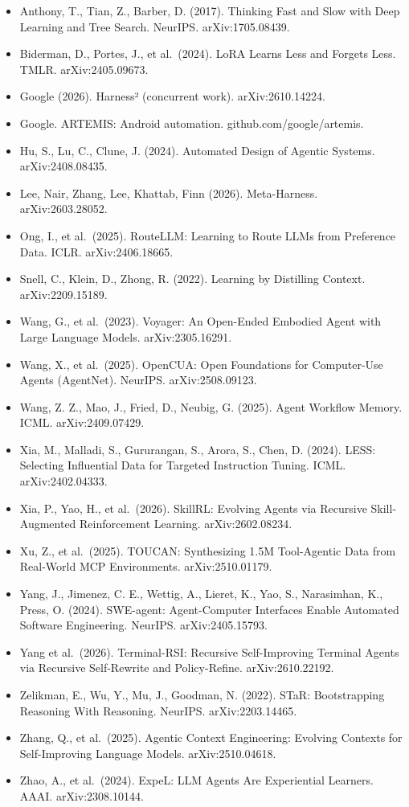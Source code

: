 \documentclass[
  10pt,
]{article}
\providecommand{\tightlist}{%
  \setlength{\itemsep}{0pt}\setlength{\parskip}{0pt}}
\begin{document}
\begin{itemize}
\tightlist
\item
  Anthony, T., Tian, Z., Barber, D. (2017). Thinking Fast and Slow with
  Deep Learning and Tree Search. NeurIPS. arXiv:1705.08439.
\item
  Biderman, D., Portes, J., et al.~(2024). LoRA Learns Less and Forgets
  Less. TMLR. arXiv:2405.09673.
\item
  Google (2026). Harness² (concurrent work). arXiv:2610.14224.
\item
  Google. ARTEMIS: Android automation. github.com/google/artemis.
\item
  Hu, S., Lu, C., Clune, J. (2024). Automated Design of Agentic Systems.
  arXiv:2408.08435.
\item
  Lee, Nair, Zhang, Lee, Khattab, Finn (2026). Meta-Harness.
  arXiv:2603.28052.
\item
  Ong, I., et al.~(2025). RouteLLM: Learning to Route LLMs from
  Preference Data. ICLR. arXiv:2406.18665.
\item
  Snell, C., Klein, D., Zhong, R. (2022). Learning by Distilling
  Context. arXiv:2209.15189.
\item
  Wang, G., et al.~(2023). Voyager: An Open-Ended Embodied Agent with
  Large Language Models. arXiv:2305.16291.
\item
  Wang, X., et al.~(2025). OpenCUA: Open Foundations for Computer-Use
  Agents (AgentNet). NeurIPS. arXiv:2508.09123.
\item
  Wang, Z. Z., Mao, J., Fried, D., Neubig, G. (2025). Agent Workflow
  Memory. ICML. arXiv:2409.07429.
\item
  Xia, M., Malladi, S., Gururangan, S., Arora, S., Chen, D. (2024).
  LESS: Selecting Influential Data for Targeted Instruction Tuning.
  ICML. arXiv:2402.04333.
\item
  Xia, P., Yao, H., et al.~(2026). SkillRL: Evolving Agents via
  Recursive Skill-Augmented Reinforcement Learning. arXiv:2602.08234.
\item
  Xu, Z., et al.~(2025). TOUCAN: Synthesizing 1.5M Tool-Agentic Data
  from Real-World MCP Environments. arXiv:2510.01179.
\item
  Yang, J., Jimenez, C. E., Wettig, A., Lieret, K., Yao, S., Narasimhan,
  K., Press, O. (2024). SWE-agent: Agent-Computer Interfaces Enable
  Automated Software Engineering. NeurIPS. arXiv:2405.15793.
\item
  Yang et al.~(2026). Terminal-RSI: Recursive Self-Improving Terminal
  Agents via Recursive Self-Rewrite and Policy-Refine. arXiv:2610.22192.
\item
  Zelikman, E., Wu, Y., Mu, J., Goodman, N. (2022). STaR: Bootstrapping
  Reasoning With Reasoning. NeurIPS. arXiv:2203.14465.
\item
  Zhang, Q., et al.~(2025). Agentic Context Engineering: Evolving
  Contexts for Self-Improving Language Models. arXiv:2510.04618.
\item
  Zhao, A., et al.~(2024). ExpeL: LLM Agents Are Experiential Learners.
  AAAI. arXiv:2308.10144.
\end{itemize}
\end{document}
